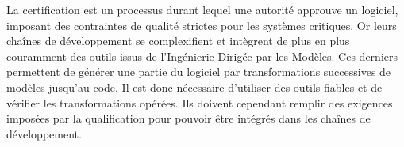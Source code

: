 \begin{ThesisAbstract}
\begin{FrenchAbstract}
\begin{spacing}{0.95}
%
%
%

La certification est un processus durant lequel une autorité approuve un
logiciel, imposant des contraintes de qualité strictes pour les systèmes
critiques. Or leurs chaînes de développement se complexifient et intègrent de
plus en plus couramment des outils issus de l'Ingénierie Dirigée par les
Modèles. Ces derniers permettent de générer une partie du logiciel par
transformations successives de modèles jusqu'au code. Il est donc nécessaire
d'utiliser des outils fiables et de vérifier les transformations opérées. Ils
doivent cependant remplir des exigences imposées par la qualification pour
pouvoir être intégrés dans les chaînes de développement.


\end{spacing}
\end{FrenchAbstract}
\end{ThesisAbstract}

